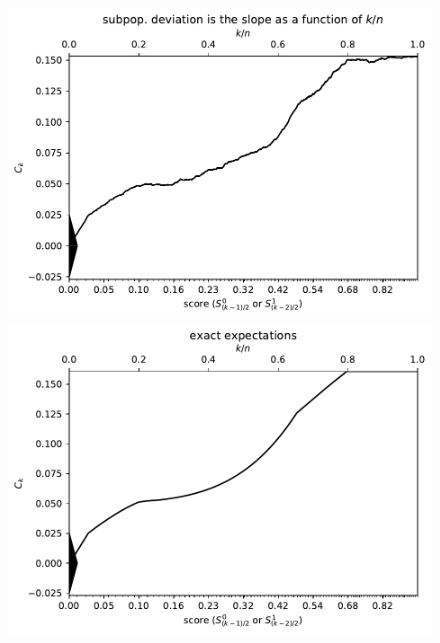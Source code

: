 \documentclass{article}
\newlength{\vertsep}
\newlength{\imsize}
\begin{document}
\begin{figure}
\begin{centering}

\parbox{\imsize}{\includegraphics[width=\imsize]
{../codes/unweighted/10000_7000_10_1/cumulative.pdf}}
\quad\quad
\parbox{\imsize}{\includegraphics[width=\imsize]
{../codes/unweighted/10000_7000_10_1/cumulative_exact.pdf}}

\vspace{\vertsep}


\end{centering}
\end{figure}
\end{document}
